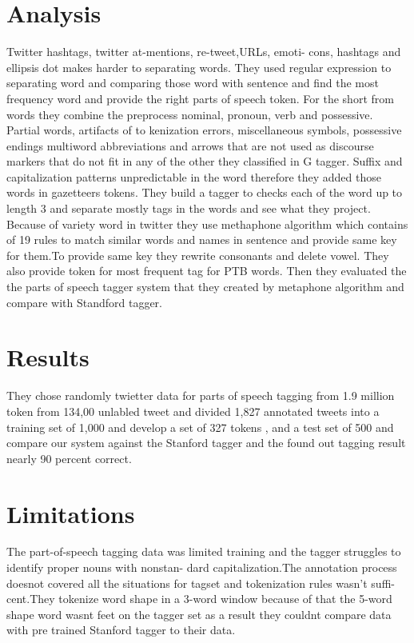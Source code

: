 \documentclass[journal, a4paper]{IEEEtran}
\begin{document}
\section{Analysis}
	Twitter hashtags, twitter at-mentions, re-tweet,URLs, emoti- cons, hashtags and ellipsis dot makes harder to separating words. They used regular expression to separating word and comparing those word with sentence and find the most frequency word and provide the right parts of speech token. For the short from words they combine the preprocess nominal, pronoun, verb and possessive. Partial words, artifacts of to kenization errors, miscellaneous symbols, possessive endings multiword abbreviations and arrows that are not used as discourse markers that do not fit in any of the other they classified in G tagger. Suffix and capitalization patterns unpredictable in the word therefore they added those words in gazetteers tokens. They build a tagger to checks each of the word up to length 3 and separate mostly tags in the words and see what they project. Because of variety word in twitter they use methaphone algorithm which contains of 19 rules to match similar words and names in sentence and provide same key for them.To provide same key they rewrite consonants and delete vowel. They also provide token for most frequent tag for PTB words. Then they evaluated the the parts of speech tagger system that they created by metaphone algorithm and compare with Standford tagger.

\section{Results}

They chose randomly twietter data for parts of speech tagging from 1.9 million token from 134,00 unlabled tweet and divided 1,827 annotated tweets into a training set of 1,000 and develop a set of 327 tokens , and a test set of 500 and compare our system against the Stanford tagger and the found out tagging result nearly 90 percent correct. 

\section{Limitations}

	The part-of-speech tagging data was limited training and the tagger struggles to identify proper nouns with nonstan- dard capitalization.The annotation process doesnot covered all the situations for tagset and tokenization rules wasn’t suffi- cent.They tokenize word shape in a 3-word window because of that the 5-word shape word wasnt feet on the tagger set as a result they couldnt compare data with pre trained Stanford tagger to their data.
\end{document}
